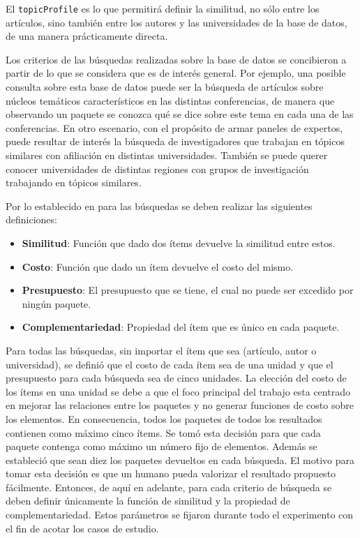 El \texttt{topicProfile} es lo que permitirá definir la similitud, no sólo entre los artículos, sino también entre los autores y las universidades de la base de datos, de una manera prácticamente directa.

Los criterios de las búsquedas realizadas sobre la base de datos se concibieron a partir de lo que se considera que es de interés general. Por ejemplo, una posible consulta sobre esta base de datos puede ser la búsqueda de artículos sobre núcleos temáticos característicos en las distintas conferencias, de manera que observando un paquete se conozca qué se dice sobre este tema en cada una de las conferencias. En otro escenario, con el propósito de armar paneles de expertos, puede resultar de interés la búsqueda de investigadores que trabajan en tópicos similares con afiliación en distintas universidades. También se puede querer conocer universidades de distintas regiones con grupos de investigación trabajando en tópicos similares.

Por lo establecido en \cite{journals/tkde/Amer-YahiaBCFMZ14} para las búsquedas se deben realizar las siguientes definiciones:
\begin{itemize}
  \item \textbf{Similitud}: Función que dado dos ítems devuelve la similitud entre estos.
  \item \textbf{Costo}: Función que dado un ítem devuelve el costo del mismo.
  \item \textbf{Presupuesto}: El presupuesto que se tiene, el cual no puede ser excedido por ningún paquete.
  \item \textbf{Complementariedad}: Propiedad del ítem que es único en cada paquete.
\end{itemize}

Para todas las búsquedas, sin importar el ítem que sea (artículo, autor o universidad), se definió que el costo de cada ítem sea de una unidad y que el presupuesto para cada búsqueda sea de cinco unidades. La elección del costo de los ítems en una unidad se debe a que el foco principal del trabajo esta centrado en mejorar las relaciones entre los paquetes y no generar funciones de costo sobre los elementos. En consecuencia, todos los paquetes de todos los resultados contienen como máximo cinco ítems. Se tomó esta decisión para que cada paquete contenga como máximo un número fijo de elementos. Además se estableció que sean diez los paquetes devueltos en cada búsqueda. El motivo para tomar esta decisión es que un humano pueda valorizar el resultado propuesto fácilmente. Entonces, de aquí en adelante, para cada criterio de búsqueda se deben definir únicamente la función de similitud y la propiedad de complementariedad. Estos parámetros se fijaron durante todo el experimento con el fin de acotar los casos de estudio.

